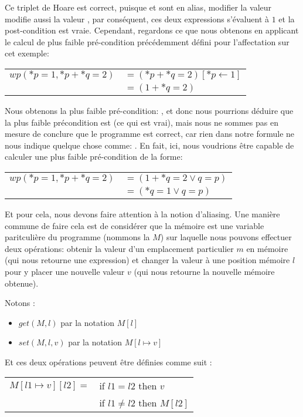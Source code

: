 Ce triplet de Hoare est correct, puisque  et  sont en
alias, modifier la valeur  modifie aussi la valeur ,
par conséquent, ces deux expressions s'évaluent à $1$ et la post-condition est 
vraie. Cependant, regardons ce que nous obtenons en applicant le calcul de plus
faible pré-condition précédemment défini pour l'affectation sur cet exemple:


\begin{tabular}{ll}
$wp(*p = 1, *p + *q = 2)$ & $= (*p + *q = 2)[*p \leftarrow 1]$\\
                          & $= (1 + *q = 2)$
\end{tabular}


Nous obtenons la plus faible pré-condition: , et donc 
nous pourrions déduire que la plus faible précondition est 
(ce qui est vrai), mais nous ne sommes pas en mesure de conclure que le programme
est correct, car rien dans notre formule ne nous indique quelque chose comme:
. En fait, ici, nous voudrions être capable de 
calculer une plus faible pré-condition de la forme:


\begin{tabular}{ll}
$wp(*p = 1, *p + *q = 2)$ & $= (1 + *q = 2 \vee q = p)$\\
                          & $= (*q = 1 \vee q = p)$
\end{tabular}


Et pour cela, nous devons faire attention à la notion d'aliasing. Une manière
commune de faire cela est de considérer que la mémoire est une variable paritculière
du programme (nommons la $M$) sur laquelle nous pouvons effectuer deux opérations:
obtenir la valeur d'un emplacement particulier $m$ en mémoire (qui nous retourne une
expression) et changer la valeur à une position mémoire $l$ pour y placer une nouvelle
valeur $v$ (qui nous retourne la nouvelle mémoire obtenue).


Notons :


\begin{itemize}
\item $get(M,l)$ par la notation $M[l]$
\item $set(M,l,v)$ par la notation $M[l \mapsto v]$
\end{itemize}


Et ces deux opérations peuvent être définies comme suit :


\begin{tabular}{ll}
  $M[l1 \mapsto v][l2] =$ & if $l1   =  l2$ then $v$ \\
                          & if $l1 \neq l2$ then $M[l2]$
\end{tabular}


